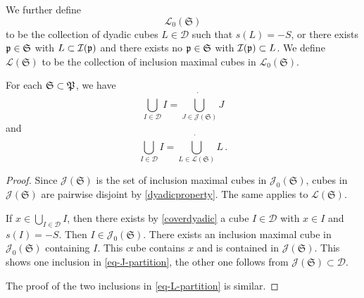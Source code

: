 We further define
$$
    \mathcal{L}_0(\mathfrak{S})
$$
to be the collection of dyadic cubes $L \in \mathcal{D}$ such that $s(L) = -S$, or there exists ${\mathfrak p} \in \mathfrak{S}$ with $L \subset {\mathcal{I}}({\mathfrak p})$ and there exists no ${\mathfrak p} \in \mathfrak{S}$ with ${\mathcal{I}}({\mathfrak p}) \subset L$. We define $\mathcal{L}(\mathfrak{S})$ to be the collection of inclusion maximal cubes in $\mathcal{L}_0(\mathfrak{S})$.

\begin{lemma}
    \label{dyadic-partitions}
    \leanok
    For each $\mathfrak{S} \subset {\mathfrak P}$, we have
    \begin{equation}
        \label{eq-J-partition}
        \bigcup_{I \in \mathcal{D}} I = \dot{\bigcup_{J \in \mathcal{J}(\mathfrak{S})}} J
    \end{equation}
    and
    \begin{equation}
        \label{eq-L-partition}
        \bigcup_{I \in \mathcal{D}} I = \dot{\bigcup_{L \in \mathcal{L}(\mathfrak{S})}} L\,.
    \end{equation}
\end{lemma}

\begin{proof}
    \leanok
    Since $\mathcal{J}(\mathfrak{S})$ is the set of inclusion maximal cubes in $\mathcal{J}_0(\mathfrak{S})$, cubes in $\mathcal{J}(\mathfrak{S})$ are pairwise disjoint by \eqref{dyadicproperty}. The same applies to $\mathcal{L}(\mathfrak{S})$.

    If $x \in \bigcup_{I \in \mathcal{D}} I$, then there exists by \eqref{coverdyadic} a cube $I \in \mathcal{D}$ with $x \in I$ and $s(I) = -S$. Then $I \in \mathcal{J}_0(\mathfrak{S})$. There exists an inclusion maximal cube in $\mathcal{J}_0(\mathfrak{S})$ containing $I$. This cube contains $x$ and is contained in $\mathcal{J}(\mathfrak{S})$. This shows one inclusion in \eqref{eq-J-partition}, the other one follows from $\mathcal{J}(\mathfrak{S}) \subset \mathcal{D}$.

    The proof of the two inclusions in \eqref{eq-L-partition} is similar.
\end{proof}

